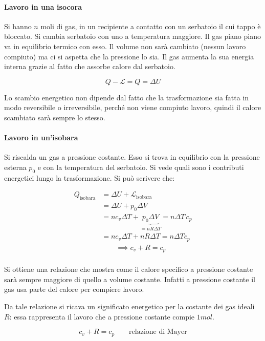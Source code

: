 \paragraph{Lavoro in una isocora} Si hanno $n$ moli di gas, in un recipiente a contatto con un serbatoio il cui tappo è bloccato. Si cambia serbatoio con uno a temperatura maggiore. Il gas piano piano va in equilibrio termico con esso. Il volume non sarà cambiato (nessun lavoro compiuto) ma ci si aspetta che la pressione lo sia. Il gas aumenta la sua energia interna grazie al fatto che assorbe calore dal serbatoio.

\[Q-\mathcal{L}=Q=\Delta U\]

Lo scambio energetico non dipende dal fatto che la trasformazione sia fatta in modo reversibile o irreversibile, perché non viene compiuto lavoro, quindi il calore scambiato sarà sempre lo stesso.

\paragraph{Lavoro in un'isobara} Si riscalda un gas a pressione costante. Esso si trova in equilibrio con la pressione esterna $p_0$ e con la temperatura del serbatoio. Si vede quali sono i contributi energetici lungo la trasformazione. Si può scrivere che:

\begin{align*}
	Q_{\text{isobara}} &= \Delta U + \mathcal{L}_{\text{isobara}} \\
		&= \Delta U + p_0\Delta V \\
		&= nc_v\Delta T + \underbrace{p_0\Delta V}_{=nR\Delta T} = n\Delta T\,c_p \tag*{(in un'isobara)} \\
		&= nc_v\Delta T + nR\Delta T = n\Delta T c_p \\
		& \qquad \implies \boxed{c_v + R = c_p  } \\
\end{align*}

Si ottiene una relazione che mostra come il calore specifico a pressione costante sarà sempre maggiore di quello a volume costante. Infatti a pressione costante il gas usa parte del calore per compiere lavoro.

Da tale relazione si ricava un significato energetico per la costante dei gas ideali $R$: essa rappresenta il lavoro che a pressione costante compie $1 mol$.

\[
	\boxed{c_v + R = c_p  }  \qquad \text{relazione di Mayer}
\]

